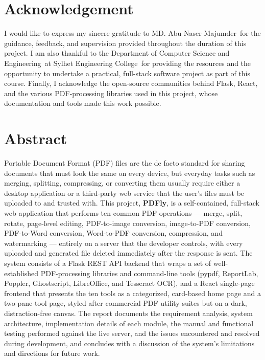 \documentclass[12pt,a4paper]{report}
\newcommand{\universityname}{Sylhet Engineering College}
\newcommand{\departmentname}{Department of Computer Science and Engineering}
\newcommand{\supervisorname}{MD. Abu Naser Majumder}
\begin{document}



\chapter*{Acknowledgement}
I would like to express my sincere gratitude to \supervisorname\ for the guidance, feedback, and
supervision provided throughout the duration of this project. I am also thankful to the
\departmentname\ at \universityname\ for providing the resources and the opportunity to undertake
a practical, full-stack software project as part of this course. Finally, I acknowledge the
open-source communities behind Flask, React, and the various PDF-processing libraries used in
this project, whose documentation and tools made this work possible.

\chapter*{Abstract}
Portable Document Format (PDF) files are the de facto standard for sharing documents that must
look the same on every device, but everyday tasks such as merging, splitting, compressing, or
converting them usually require either a desktop application or a third-party web service that
the user's files must be uploaded to and trusted with. This project, \textbf{PDFly}, is a
self-contained, full-stack web application that performs ten common PDF operations --- merge,
split, rotate, page-level editing, PDF-to-image conversion, image-to-PDF conversion, PDF-to-Word
conversion, Word-to-PDF conversion, compression, and watermarking --- entirely on a server that
the developer controls, with every uploaded and generated file deleted immediately after the
response is sent. The system consists of a Flask REST API backend that wraps a set of
well-established PDF-processing libraries and command-line tools (pypdf, ReportLab, Poppler,
Ghostscript, LibreOffice, and Tesseract OCR), and a React single-page frontend that presents the
ten tools as a categorized, card-based home page and a two-pane tool page, styled after
commercial PDF utility suites but on a dark, distraction-free canvas. The report documents the
requirement analysis, system architecture, implementation details of each module, the manual and
functional testing performed against the live server, and the issues encountered and resolved
during development, and concludes with a discussion of the system's limitations and directions
for future work.
\newpage
\tableofcontents
\listoffigures
\listoftables
\end{document}
